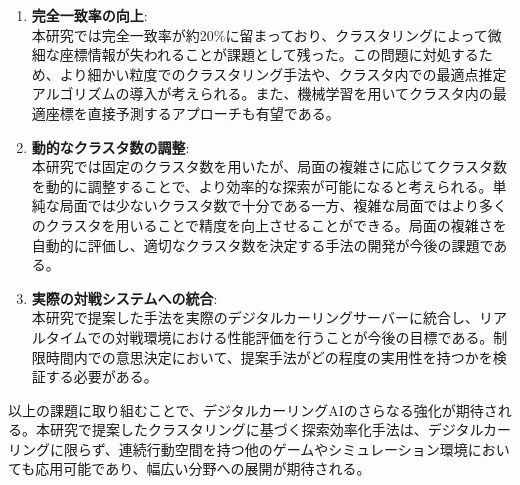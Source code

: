 \documentclass[11pt,a4j]{jreport}
\begin{document}
\begin{enumerate}
    \item \textbf{完全一致率の向上}: \\
    本研究では完全一致率が約20\%に留まっており、クラスタリングによって微細な座標情報が失われることが課題として残った。この問題に対処するため、より細かい粒度でのクラスタリング手法や、クラスタ内での最適点推定アルゴリズムの導入が考えられる。また、機械学習を用いてクラスタ内の最適座標を直接予測するアプローチも有望である。
    
    \item \textbf{動的なクラスタ数の調整}: \\
    本研究では固定のクラスタ数を用いたが、局面の複雑さに応じてクラスタ数を動的に調整することで、より効率的な探索が可能になると考えられる。単純な局面では少ないクラスタ数で十分である一方、複雑な局面ではより多くのクラスタを用いることで精度を向上させることができる。局面の複雑さを自動的に評価し、適切なクラスタ数を決定する手法の開発が今後の課題である。
    
    \item \textbf{実際の対戦システムへの統合}: \\
    本研究で提案した手法を実際のデジタルカーリングサーバーに統合し、リアルタイムでの対戦環境における性能評価を行うことが今後の目標である。制限時間内での意思決定において、提案手法がどの程度の実用性を持つかを検証する必要がある。
\end{enumerate}

以上の課題に取り組むことで、デジタルカーリングAIのさらなる強化が期待される。本研究で提案したクラスタリングに基づく探索効率化手法は、デジタルカーリングに限らず、連続行動空間を持つ他のゲームやシミュレーション環境においても応用可能であり、幅広い分野への展開が期待される。




\renewcommand{\bibname}{参考文献} %
\end{document}

